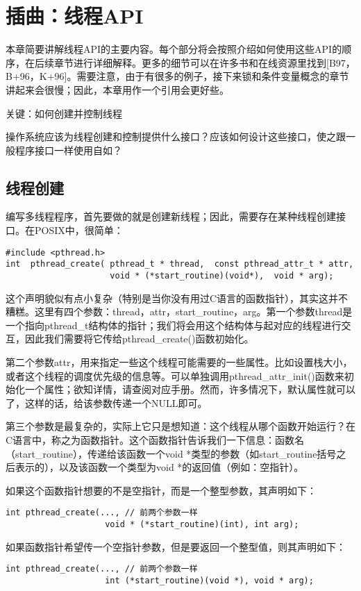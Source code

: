 \chapter{插曲：线程API}
\thispagestyle{empty}

本章简要讲解线程API的主要内容。每个部分将会按照介绍如何使用这些API的顺序，在后续章节进行详细解释。更多的细节可以在许多书和在线资源里找到[B97，B+96，K+96]。需要注意，由于有很多的例子，接下来锁和条件变量概念的章节讲起来会很慢；因此，本章用作一个引用会更好些。

\begin{tcolorbox}[colframe=grey,colback= grey,arc=0pt,left=6pt,right=6pt,top=6pt,bottom=6pt,boxsep=0pt]
\begin{center}关键：如何创建并控制线程
\end{center}
操作系统应该为线程创建和控制提供什么接口？应该如何设计这些接口，使之跟一般程序接口一样使用自如？
\end{tcolorbox}

\section{线程创建}
编写多线程程序，首先要做的就是创建新线程；因此，需要存在某种线程创建接口。在POSIX中，很简单：
\begin{verbatim}
#include <pthread.h>
int  pthread_create( pthread_t * thread,  const pthread_attr_t * attr,
                     void * (*start_routine)(void*),  void * arg);
\end{verbatim}
这个声明貌似有点小复杂（特别是当你没有用过C语言的函数指针），其实这并不糟糕。这里有四个参数：thread，attr，start\_routine，arg。第一个参数thread是一个指向pthread\_t结构体的指针；我们将会用这个结构体与起对应的线程进行交互，因此我们需要将它传给pthread\_create()函数初始化。

第二个参数attr，用来指定一些这个线程可能需要的一些属性。比如设置栈大小，或者这个线程的调度优先级的信息等。可以单独调用pthread\_attr\_init()函数来初始化一个属性；欲知详情，请查阅对应手册。然而，许多情况下，默认属性就可以了，这样的话，给该参数传递一个NULL即可。

第三个参数是最复杂的，实际上它只是想知道：这个线程从哪个函数开始运行？在C语言中，称之为函数指针。这个函数指针告诉我们一下信息：函数名（start\_routine），传递给该函数一个void *类型的参数（如start\_routine括号之后表示的），以及该函数一个类型为void *的返回值（例如：空指针）。

如果这个函数指针想要的不是空指针，而是一个整型参数，其声明如下：
\begin{verbatim}
int pthread_create(..., // 前两个参数一样
                    void * (*start_routine)(int), int arg);
\end{verbatim}
如果函数指针希望传一个空指针参数，但是要返回一个整型值，则其声明如下：
\begin{verbatim}
int pthread_create(..., // 前两个参数一样
                    int (*start_routine)(void *), void * arg);
\end{verbatim}

